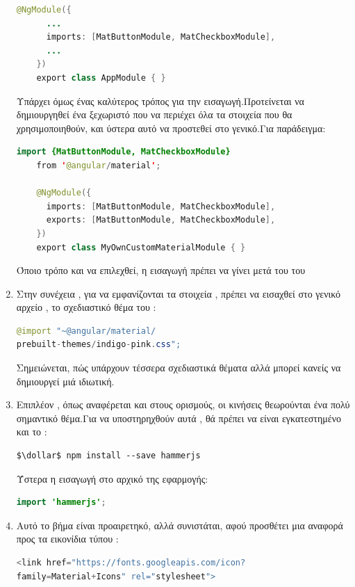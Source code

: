 \begin{enumerate}[label=\textbf{\arabic*}]
\begin{lstlisting}[language=Java]
    @NgModule({
      ...
      imports: [MatButtonModule, MatCheckboxModule],
      ...
    })
    export class AppModule { }
\end{lstlisting}
Υπάρχει όμως ένας καλύτερος τρόπος για την εισαγωγή.Προτείνεται να δημιουργηθεί ένα ξεχωριστό  που να περιέχει όλα τα στοιχεία που θα χρησιμοποιηθούν, και ύστερα αυτό να προστεθεί στο γενικό.Για παράδειγμα:
\begin{lstlisting}[language=Java]
   import {MatButtonModule, MatCheckboxModule} 
    from '@angular/material';

    @NgModule({
      imports: [MatButtonModule, MatCheckboxModule],
      exports: [MatButtonModule, MatCheckboxModule],
    })
    export class MyOwnCustomMaterialModule { }
\end{lstlisting}
Όποιο τρόπο και να επιλεχθεί, η εισαγωγή πρέπει να γίνει μετά του  του 
    \item Στην συνέχεια , για να εμφανίζονται τα στοιχεία , πρέπει να εισαχθεί στο γενικό αρχείο , το σχεδιαστικό θέμα του :
\begin{lstlisting}[language=JAVA]
@import "~@angular/material/
prebuilt-themes/indigo-pink.css";
\end{lstlisting}
Σημειώνεται, πώς υπάρχουν τέσσερα σχεδιαστικά θέματα αλλά μπορεί κανείς να δημιουργεί μιά ιδιωτική.
    \item Επιπλέον , όπως αναφέρεται και στους ορισμούς, οι κινήσεις θεωρούνται ένα πολύ σημαντικό θέμα.Για να υποστηρηχθούν αυτά , θά πρέπει να είναι εγκατεστημένο και το :
\begin{lstlisting}[language=command.com]
   $\dollar$ npm install --save hammerjs
\end{lstlisting}
Ύστερα η εισαγωγή στο αρχικό  της εφαρμογής:
\begin{lstlisting}[language=JAVA]
   import 'hammerjs';
\end{lstlisting}
    \item Αυτό το βήμα είναι προαιρετηκό, αλλά συνιστάται, αφού προσθέτει μια αναφορά προς τα εικονίδια τύπου :
\begin{lstlisting}[language=JAVA]
<link href="https://fonts.googleapis.com/icon?
family=Material+Icons" rel="stylesheet">
\end{lstlisting}
\end{enumerate}

